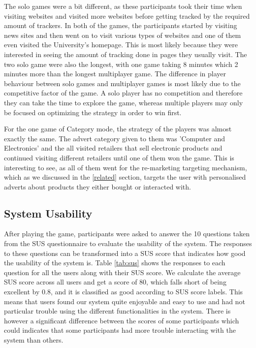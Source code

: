 \documentclass{l4proj}
\begin{document}
The solo games were a bit different, as these participants took their time when visiting websites and visited more websites before getting tracked by the required amount of trackers. In both of the games, the participants started by visiting news sites and then went on to visit various types of websites and one of them even visited the University's homepage. This is most likely because they were interested in seeing the amount of tracking done in pages they usually visit. The two solo game were also the longest, with one game taking 8 minutes which 2 minutes more than the longest multiplayer game.
The difference in player behaviour between solo games and multiplayer games is most likely due to the competitive factor of the game. A solo player has no competition and therefore they can take the time to explore the game, whereas multiple players may only be focused on optimizing the strategy in order to win first. 

For the one game of Category mode, the strategy of the players was almost exactly the same. The advert category given to them was 'Computer and Electronics' and the all visited retailers that sell electronic products and continued visiting different retailers until one of them won the game. This is interesting to see, as all of them went for the re-marketing targeting mechanism, which as we discussed in the \ref{related} section, targets the user with personalised adverts about products they either bought or interacted with.

\subsection{System Usability}
After playing the game, participants were asked to answer the 10 questions taken from the SUS questionnaire to evaluate the usability of the system. The responses to these questions can be transformed into a SUS score that indicates how good the usability of the system is. Table \ref{tab:sus} shows the responses to each question for all the users along with their SUS score. We calculate the average SUS score across all users and get a score of 80, which falls short of being excellent by 0.8, and it is classified as good according to SUS score labels. This means that users found our system quite enjoyable and easy to use and had not particular trouble using the different functionalities in the system. There is however a significant difference between the scores of some participants which could indicates that some participants had more trouble interacting with the system than others.
\end{document}
